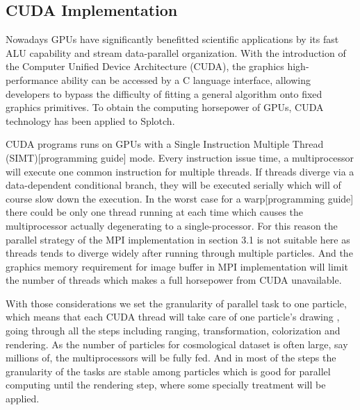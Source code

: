 \subsection{CUDA Implementation}
\label{cuda}
Nowadays GPUs have significantly benefitted scientific applications by its fast ALU capability and stream data-parallel organization. With the introduction of the Computer Unified Device Architecture (CUDA), the graphics high-performance ability can be accessed by a C language interface, allowing developers to bypass the difficulty of fitting a general algorithm onto fixed graphics primitives. To obtain the computing horsepower of GPUs, CUDA technology has been applied to Splotch.

CUDA programs runs on GPUs with a Single Instruction Multiple Thread (SIMT)[programming guide] mode. Every instruction issue time, a multiprocessor will execute one common instruction for multiple threads. If threads diverge via a data-dependent conditional branch, they will be executed serially which will of course slow down the execution. In the worst case for a warp[programming guide] there could be only one thread running at each time which causes the multiprocessor actually degenerating to a single-processor. For this reason the parallel strategy of the MPI implementation in section 3.1 is not suitable here as threads tends to diverge widely after running through multiple particles. And the graphics memory requirement for image buffer in MPI implementation will limit the number of threads which makes a full horsepower from CUDA unavailable.

With those considerations we set the granularity of parallel task to one particle, which means that each CUDA thread will take care of one particle's drawing , going through all the steps including ranging, transformation, colorization and rendering. As the number of particles for cosmological dataset is often large, say millions of, the multiprocessors will be fully fed. And in most of the steps the granularity of the tasks are stable among particles which is good for parallel computing until the rendering step, where some specially treatment will be applied.

